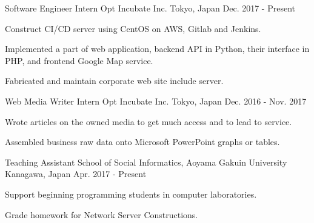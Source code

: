 


\begin{cventries}
  \cventry
    {Software Engineer Intern} %
    {Opt Incubate Inc.} %
    {Tokyo, Japan} %
    {Dec. 2017 - Present} %
    {
      \begin{cvitems} %
        \item {Construct CI/CD server using CentOS on AWS, Gitlab and Jenkins.}        
        \item {Implemented a part of web application, backend API in Python, their interface in PHP, and frontend Google Map service.}
        \item {Fabricated and maintain corporate web site include server.}
      \end{cvitems}
    }

  \cventry
    {Web Media Writer Intern} %
    {Opt Incubate Inc.} %
    {Tokyo, Japan} %
    {Dec. 2016 - Nov. 2017} %
    {
      \begin{cvitems} %
        \item {Wrote articles on the owned media to get much access and to lead to service.}
        \item {Assembled business raw data onto Microsoft PowerPoint graphs or tables.}
      \end{cvitems}
    }
\end{cventries}    

\begin{cventries}
  \cventry
    {Teaching Assistant} %
    {School of Social Informatics, Aoyama Gakuin University} %
    {Kanagawa, Japan} %
    {Apr. 2017 - Present} %
    {
      \begin{cvitems} %
        \item {Support beginning programming students in computer laboratories.}
        \item {Grade homework for Network Server Constructions.}
      \end{cvitems}
    }
\end{cventries}

